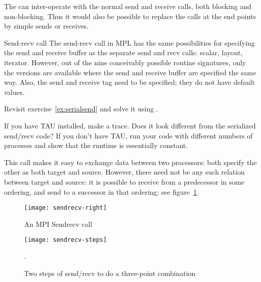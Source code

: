 \begin{remark}
  The  can inter-operate with
  the normal send and receive calls, both blocking and non-blocking.
  Thus it would also be possible to replace the 
  calls at the end points by simple sends or receives.
\end{remark}

\begin{mplnote}{Send-recv call}
  The send-recv call in \ac{MPL} has the same possibilities
  for specifying the send and receive buffer as the separate send and recv calls:
  scalar, layout, iterator. However, out of the nine conceivably possible
  routine signatures, only the versions are available where the send and receive buffer
  are specified the same way.
  Also, the send and receive tag need to be specified; they do not have default values.

  \begin{multicols}{2}
    \columnbreak
  \end{multicols}
\end{mplnote}

\begin{exercise}
  \label{ex:rightsendrecv}
  Revisit exercise~\ref{ex:serialsend} and solve it using
  .

  If you have TAU installed, make a trace. Does it look different
  from the serialized send/recv code? If you don't have TAU, run your
  code with different numbers of processes and show that the runtime
  is essentially constant.
\end{exercise}

This call makes it easy to exchange data between two processors: both
specify the other as both target and source. However, there need not
be any such relation between target and source: it is possible to
receive from a predecessor in some ordering, and send to a successor
in that ordering; see figure~\ref{fig:sendrecv}.

\begin{figure}[ht]
  \texttt{[image: sendrecv-right]}
  \caption{An MPI Sendrecv call}
  \label{fig:sendrecv}
\end{figure}

\begin{figure}[ht]
  \texttt{[image: sendrecv-steps]}
  \caption{Two steps of send/recv to do a three-point combination}
  \label{fig:sendrecv-steps}.
\end{figure}

